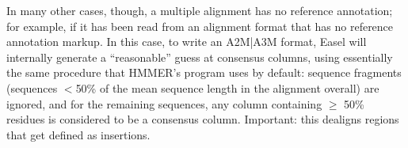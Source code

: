 In many other cases, though, a multiple alignment has no reference
annotation; for example, if it has been read from an alignment format
that has no reference annotation markup. In this case, to write an
A2M|A3M format, Easel will internally generate a ``reasonable'' guess
at consensus columns, using essentially the same procedure that
HMMER's  program uses by default: sequence fragments
(sequences $<$50\% of the mean sequence length in the alignment
overall) are ignored, and for the remaining sequences, any column
containing $\geq$ 50\% residues is considered to be a consensus
column. Important: this dealigns regions that get defined as
insertions.










